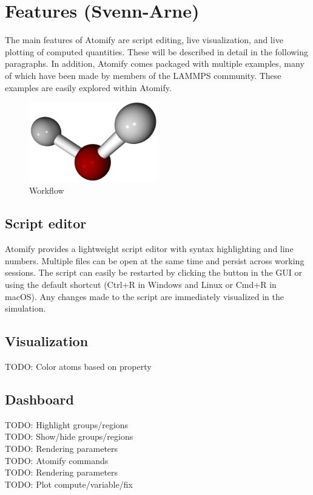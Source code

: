 \documentclass[aps,pre,twocolumn,letterpaper,floatfix]{revtex4-1}
\begin{document}
\section{Features (Svenn-Arne)}

The main features of Atomify are script editing,
live visualization, and live plotting of computed quantities.
These will be described in detail in the following paragraphs.
In addition, Atomify comes packaged with multiple examples,
many of which have been made by members of the LAMMPS community.
These examples are easily explored within Atomify.

\begin{figure}
	\centering
	\includegraphics[width=0.5\textwidth]{final_billboard.png}
	\caption{Workflow}
	\label{fig:gui}
\end{figure}


\subsection{Script editor}
Atomify provides a lightweight script editor with syntax highlighting and line
numbers.
Multiple files can be open at the same time and persist across working sessions.
The script can easily be restarted by clicking the button in the GUI or using
the default shortcut (Ctrl+R in Windows and Linux or Cmd+R in macOS).
Any changes made to the script are immediately visualized in the simulation.

\subsection{Visualization}
TODO: Color atoms based on property \\

\subsection{Dashboard}
TODO: Highlight groups/regions \\
TODO: Show/hide groups/regions \\
TODO: Rendering parameters \\
TODO: Atomify commands \\
TODO: Rendering parameters \\
TODO: Plot compute/variable/fix \\
\end{document}

